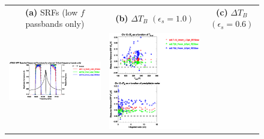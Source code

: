 \begin{figure}[H]
  \centering
  \begin{tabular}{c c c}
    \textsf{\textbf{(a)} SRFs (low $f$ passbands only)} &
    \textsf{\textbf{(b)} $\Delta T_B$ $(\epsilon_s = 1.0)$} &
    \textsf{\textbf{(c)} $\Delta T_B$ $(\epsilon_s = 0.6)$} \\
    \includegraphics[bb=80 400 280 558,clip,scale=0.85]{graphics/srf/Tset/atms_npp.ch13.osrf.eps} &
    \includegraphics[bb=85 400 260 558,clip,scale=0.85]{graphics/dtb/Tset/e1.0_r0.0/atms_npp.ch13.dTb.eps} & 

\end{tabular}
\end{figure}
